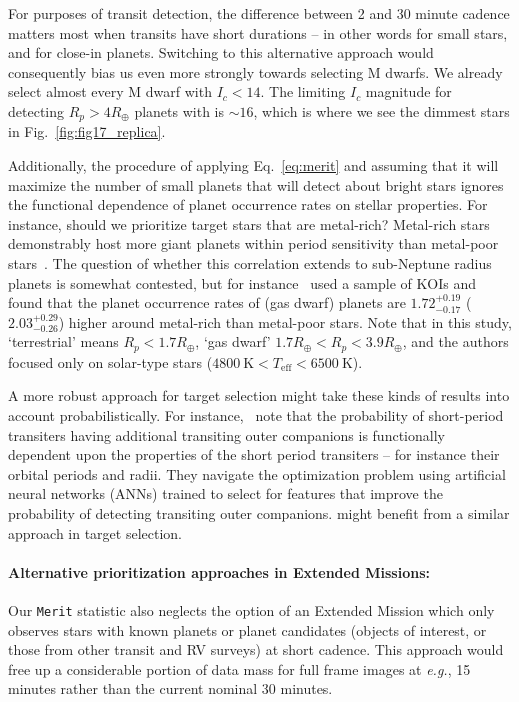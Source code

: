 For purposes of transit detection, the difference between 2 and 30
minute cadence matters most when transits have short durations -- in
other words for small stars, and for close-in planets.  Switching to
this alternative approach would consequently bias us even more
strongly towards selecting M dwarfs.  We already select almost every M
dwarf with $I_c < 14$.  The limiting $I_c$ magnitude for detecting
$R_p > 4R_\oplus$ planets with \tess is $\sim\!16$, which is where we
see the dimmest stars in Fig.~\ref{fig:fig17_replica}.

Additionally, the procedure of applying Eq.~\ref{eq:merit} and
assuming that it will maximize the number of small planets that \tess
will detect about bright stars ignores the functional dependence of
planet occurrence rates on stellar properties.  For instance, should
we prioritize target stars that are metal-rich?  Metal-rich stars
demonstrably host more giant planets within \tesss period sensitivity
than metal-poor
stars~\citep{fischer_planet-metallicity_2005,johnson_giant_2010}.  The
question of whether this correlation extends to sub-Neptune radius
planets is somewhat contested, but for
instance~\citet{wang_revealing_2015} used a sample of KOIs and found
that the planet occurrence rates of (gas dwarf) planets are
$1.72^{+0.19}_{-0.17}$ ($2.03^{+0.29}_{-0.26}$) higher around
metal-rich than metal-poor stars.  Note that in this study,
`terrestrial' means $R_p<1.7R_\oplus$, `gas dwarf' 
$1.7R_\oplus < R_p < 3.9R_\oplus$, and the authors focused only on
solar-type stars ($4800\ \mathrm{K}<T_\mathrm{eff}<6500\ \mathrm{K}$).

A more robust approach for \tesss target selection might take these
kinds of results into account probabilistically.  For
instance,~\protect\citet{kipping_transit_2016} note that the
probability of short-period transiters having additional transiting
outer companions is functionally dependent upon the properties of the
short period transiters -- for instance their orbital periods and
radii.  They navigate the optimization problem using artificial neural
networks (ANNs) trained to select for features that improve the
probability of detecting transiting outer companions.  \tess might
benefit from a similar approach in target selection.

\paragraph{Alternative prioritization approaches in Extended Missions:}
Our \texttt{Merit} statistic also neglects the option of an Extended
Mission which only observes stars with known planets or planet
candidates (\tesss objects of interest, or those from other transit
and RV surveys) at short cadence.  This approach would free up a
considerable portion of \tesss data mass for full frame images at
\textit{e.g.}, 15 minutes rather than the current nominal 30 minutes.

